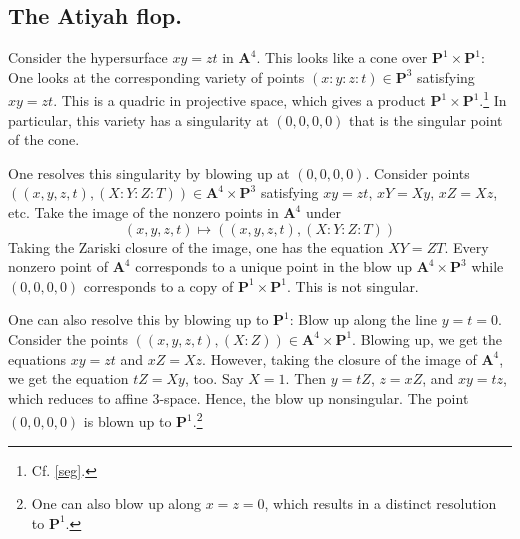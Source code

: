 \documentclass [11 pt, oneside] {article}
\begin{document}
\subsection{The Atiyah flop.}

Consider the hypersurface $xy=zt$ in $\mathbf{A}^4$. This looks like a cone over $\mathbf{P}^1\times \mathbf{P}^1$: One looks at the corresponding variety of points $(x:y:z:t)\in \mathbf{P}^3$ satisfying $xy=zt$. This is a quadric in projective space, which gives a product $\mathbf{P}^1\times \mathbf{P}^1$.\footnote{Cf. \cref{seg}.} In particular, this variety has a singularity at $(0,0,0,0)$ that is the singular point of the cone.

One resolves this singularity by blowing up at $(0,0,0,0)$. Consider points $((x,y,z,t),  (X:Y:Z:T)) \in \mathbf{A}^4\times \mathbf{P}^3$ satisfying $xy=zt$, $xY=Xy$, $xZ = Xz$, etc. Take the image of the nonzero points in $\mathbf{A}^4$ under
\[
	(x,y,z,t)\longmapsto  ((x,y,z,t),  (X:Y:Z:T))
	\]
	Taking the Zariski closure of the image, one has the equation $XY=ZT$. Every nonzero point of $\mathbf{A}^4$ corresponds to a unique point in the blow up $\mathbf{A}^4\times \mathbf{P}^3$ while $(0,0,0,0)$ corresponds to a copy of $\mathbf{P}^1\times \mathbf{P}^1$. This is not singular.

	One can also resolve this by blowing up to $\mathbf{P}^1$: Blow up along the line $y=t=0$. Consider the points $((x,y,z,t),  (X:Z)) \in \mathbf{A}^4\times \mathbf{P}^1$. Blowing up, we get the equations $xy=zt$ and $xZ=Xz$. However, taking the closure of the image of $\mathbf{A}^4$, we get the equation $tZ = Xy$, too. Say $X=1$. Then $y=tZ$, $z=xZ$, and $xy=tz$, which reduces to affine $3$-space. Hence, the blow up nonsingular. The point $(0,0,0,0)$ is blown up to $\mathbf{P}^1$.\footnote{One can also blow up along $x=z=0$, which results in a distinct resolution to $\mathbf{P}^1$.}
\end{document}
